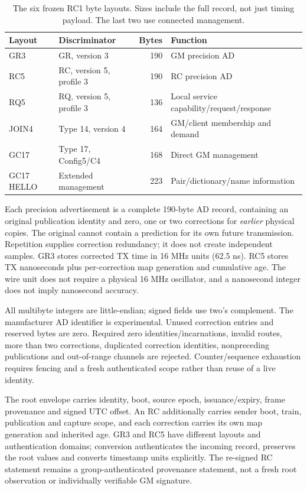 \documentclass[11pt,letterpaper]{article}
\begin{document}
\begin{table}[htbp]\centering\small
\caption{The six frozen RC1 byte layouts. Sizes include the full record, not just timing payload. The last two use connected management.}\label{tab:wire}
\begin{tabular}{@{}llrl@{}}\toprule
Layout & Discriminator & Bytes & Function\\\midrule
GR3 & GR, version 3 &190&GM precision AD\\
RC5 & RC, version 5, profile 3 &190&RC precision AD\\
RQ5 & RQ, version 5, profile 3 &136&Local service capability/request/response\\
JOIN4 & Type 14, version 4 &164&GM/client membership and demand\\
GC17 & Type 17, Config5/C4 &168&Direct GM management\\
GC17 HELLO & Extended management &223&Pair/dictionary/name information\\\bottomrule
\end{tabular}
\end{table}

Each precision advertisement is a complete 190-byte AD record, containing an original publication identity and zero, one or two corrections for \emph{earlier} physical copies. The original cannot contain a prediction for its own future transmission. Repetition supplies correction redundancy; it does not create independent samples. GR3 stores corrected TX time in 16 MHz units (62.5 ns). RC5 stores TX nanoseconds plus per-correction map generation and cumulative age. The wire unit does not require a physical 16 MHz oscillator, and a nanosecond integer does not imply nanosecond accuracy.

All multibyte integers are little-endian; signed fields use two's complement. The manufacturer AD identifier  is experimental. Unused correction entries and reserved bytes are zero. Required zero identities/incarnations, invalid routes, more than two corrections, duplicated correction identities, nonpreceding publications and out-of-range channels are rejected. Counter/sequence exhaustion requires fencing and a fresh authenticated scope rather than reuse of a live identity.

The root envelope carries identity, boot, source epoch, issuance/expiry, frame provenance and signed UTC offset. An RC additionally carries sender boot, train, publication and capture scope, and each correction carries its own map generation and inherited age. GR3 and RC5 have different layouts and authentication domains; conversion authenticates the incoming record, preserves the root values and converts timestamp units explicitly. The re-signed RC statement remains a group-authenticated provenance statement, not a fresh root observation or individually verifiable GM signature.
\end{document}
